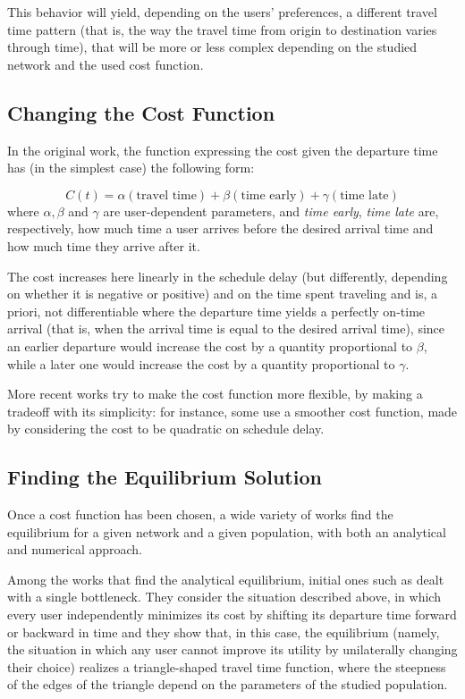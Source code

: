 This behavior will yield, depending on the users' preferences,
a different travel time pattern (that is, the way the travel time from origin to destination varies through time),
that will be more or less complex depending on the studied network and the used cost function.

\subsection{Changing the Cost Function}

In the original work, the function expressing the cost given the departure time has (in the simplest case) the following form:

\begin{equation}
  \label{eq:cost_intro}
  C(t) = \alpha(\text{travel time}) + \beta (\text{time early}) + \gamma (\text{time late})
\end{equation}
where \(\alpha, \beta\) and \(\gamma\) are user-dependent parameters, and \textit{time early}, \textit{time late} are, respectively, how much time a user arrives before the desired arrival time and how much time they arrive after it.

The cost increases here linearly in the schedule delay (but differently, depending on whether it is negative or positive) and on the time spent traveling and is, a priori, not differentiable where the departure time yields a perfectly on-time arrival
(that is, when the arrival time is equal to the desired arrival time),
since an earlier departure would increase the cost by a quantity proportional to \(\beta\),
while a later one would increase the cost by a quantity proportional to \(\gamma\).

More recent works try to make the cost function more flexible,
by making a tradeoff with its simplicity:
for instance, some use a smoother cost function,
made by considering the cost to be quadratic on schedule delay.

\subsection{Finding the Equilibrium Solution}


Once a cost function has been chosen, a wide variety of works find the equilibrium for a given network and a given population,
with both an analytical and numerical approach.

Among the works that find the analytical equilibrium, initial ones such as \textcite{de1983stochastic} dealt with a single bottleneck.
They consider the situation described above, in which every user independently minimizes its cost by shifting its departure time forward or backward in time and they show that,
in this case, the equilibrium
(namely, the situation in which any user cannot improve its utility by unilaterally changing their choice)
realizes a triangle-shaped travel time function, where the steepness of the edges of the triangle depend on the parameters of the studied population.

